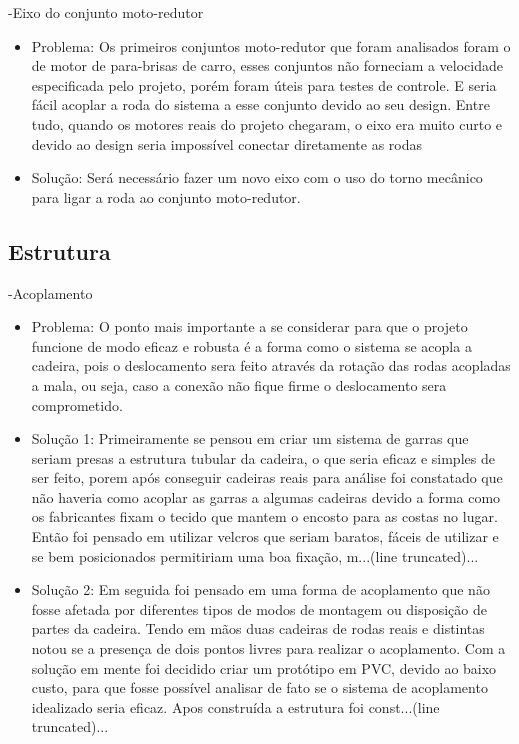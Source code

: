 -Eixo do conjunto moto-redutor
 \begin{itemize}
  \item Problema: Os primeiros conjuntos moto-redutor que foram analisados foram o de motor de para-brisas de carro, esses conjuntos não forneciam a velocidade especificada pelo projeto, porém foram úteis para testes de controle. E seria fácil acoplar a roda do sistema a esse conjunto devido ao seu design. Entre tudo, quando os motores reais do projeto chegaram, o eixo era muito curto e devido ao design seria impossível conectar diretamente as rodas
  \item Solução: Será necessário fazer um novo eixo com o uso do torno mecânico para ligar a roda ao conjunto moto-redutor.

 \end{itemize}

\subsection{Estrutura}
-Acoplamento
 \begin{itemize}
  \item Problema: O ponto mais importante a se considerar para que o projeto funcione de modo eficaz e robusta é a forma como o sistema se acopla a cadeira, pois o deslocamento sera feito através da rotação das rodas acopladas a mala, ou seja, caso  a conexão não fique firme o deslocamento sera comprometido.
  \item Solução 1: Primeiramente se pensou em criar um sistema de garras que seriam presas a estrutura tubular da cadeira, o que seria eficaz e simples de ser feito, porem após conseguir cadeiras reais para análise foi constatado que não haveria como acoplar as garras a algumas cadeiras devido a forma como os fabricantes fixam o tecido que mantem o encosto para as costas no lugar. Então foi pensado em utilizar velcros que seriam baratos, fáceis de utilizar e se bem posicionados permitiriam uma boa fixação, m...(line truncated)...
  \item Solução 2: Em seguida foi pensado em uma forma de acoplamento que não fosse afetada por diferentes tipos de modos de montagem ou disposição de partes da cadeira. Tendo em mãos duas cadeiras de rodas reais e distintas notou se a presença de dois pontos livres para realizar o acoplamento. Com a solução em mente foi decidido criar um protótipo em PVC, devido ao baixo custo, para que fosse possível analisar de fato se o sistema de acoplamento idealizado seria eficaz. Apos construída a estrutura foi const...(line truncated)...

 \end{itemize}

